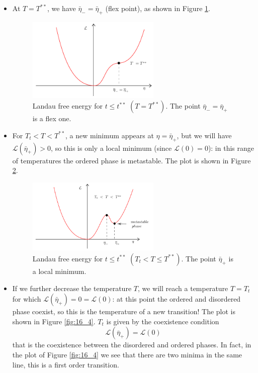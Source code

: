 \documentclass[../main/main.tex]{subfiles}
\begin{document}
\begin{itemize}
  \begin{itemize}
  \item At \( T = T^{**}\), we have \( \bar{\eta }_- = \bar{\eta }_+   \) (flex point), as shown in Figure \ref{fig:16_2}.
  \begin{figure}[h!]
  \centering
  \includegraphics[width=0.6\textwidth]{../lessons/16_image/2.pdf}
  \caption{\label{fig:16_2} Landau free energy for \( t\le t^{**} \) \( ( T = T^ {**}) \). The point \( \bar{\eta }_- =\bar{\eta }_+   \) is a flex one.}
  \end{figure}


  \item For \( T_t < T < T^{**} \), a new minimum appears at \( \eta = \bar{\eta }_+   \), but we will have \( \mathcal{L} (\bar{\eta }_+) >0  \), so  this is only a local minimum (since \( \mathcal{L}(0)=0 \)):  in this range of temperatures the ordered phase is metastable. The plot is shown in Figure  \ref{fig:16_3}.
  \begin{figure}[h!]
  \centering
  \includegraphics[width=0.6\textwidth]{../lessons/16_image/3.pdf}
  \caption{\label{fig:16_3} Landau free energy for \( t\le t^{**} \) \( ( T_t <T \le T^ {**}) \). The point \( \bar{\eta }_+   \) is a local minimum.}
  \end{figure}


  \item If we further decrease the temperature \( T \), we will reach a temperature \( T=T_t \) for which \(\mathcal{L} (\bar{\eta }_+ ) = 0 = \mathcal{L}(0)  \):  at this point the ordered and disordered phase coexist, so this is the temperature of a new transition! The plot is shown in Figure  \ref{fig:16_4}. \( T_t \)  is given by the coexistence condition
  \begin{equation*}
    \mathcal{L} (\bar{\eta }_+ ) = \mathcal{L} (0)
  \end{equation*}
  that is the coexistence between the disordered and ordered phases. In fact, in the plot of Figure \ref{fig:16_4} we see that there are two minima in the same line, this is  a first order transition.


\end{itemize}
\end{itemize}
\end{document}
